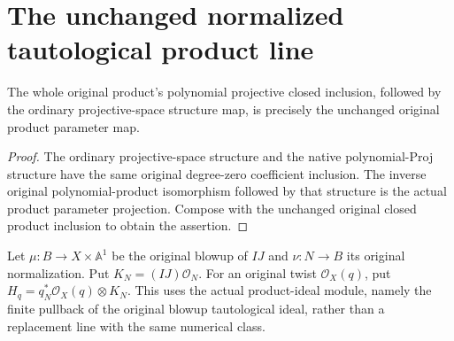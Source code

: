 \section{The unchanged normalized tautological product line}

\begin{lemma}
\label{lem:pl-original-polynomial-inclusion-parameter-structure}
\leanok
The whole original product's polynomial projective closed inclusion,
followed by the ordinary projective-space structure map, is precisely the
unchanged original product parameter map.
\end{lemma}
\begin{proof}
\leanok
The ordinary projective-space structure and the native polynomial-Proj
structure have the same original degree-zero coefficient inclusion.
The inverse original polynomial-product isomorphism followed by that
structure is the actual product parameter projection. Compose with the
unchanged original closed product inclusion to obtain the assertion.
\end{proof}

\begin{definition}
\label{def:pl-original-normalized-tautological-product-line}
\leanok
Let $\mu:B\to X\times\mathbb A^1$ be the original blowup of $IJ$ and
$\nu:N\to B$ its original normalization. Put
$K_N=(IJ)\mathcal O_N$. For an original twist $\mathcal O_X(q)$, put
$H_q=q_N^*\mathcal O_X(q)\otimes K_N$. This uses the actual product-ideal
module, namely the finite pullback of the original blowup tautological
ideal, rather than a replacement line with the same numerical class.
\end{definition}


